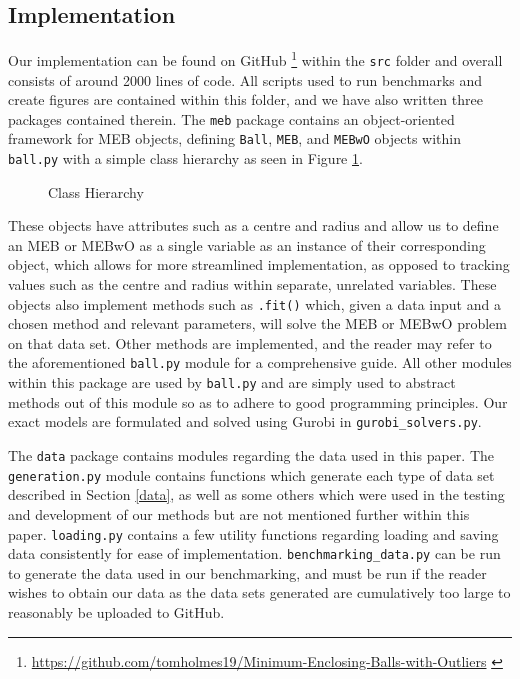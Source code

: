 \documentclass[11pt,twoside]{report}
\theoremstyle{definition}
\numberwithin{theorem}{section}
\numberwithin{definition}{section}
\numberwithin{lemma}{section}
\numberwithin{proposition}{section}
\numberwithin{equation}{section}
\numberwithin{figure}{section}
\begin{document}
\subsection{Implementation}
Our implementation can be found on GitHub \footnote{\url{https://github.com/tomholmes19/Minimum-Enclosing-Balls-with-Outliers} \cite{Holmes_Minimum_Enclosing_Balls_2021}} within the \texttt{src} folder and overall consists of around 2000 lines of code. All scripts used to run benchmarks and create figures are contained within this folder, and we have also written three packages contained therein. The \texttt{meb} package contains an object-oriented framework for MEB objects, defining \texttt{Ball}, \texttt{MEB}, and \texttt{MEBwO} objects within \texttt{ball.py} with a simple class hierarchy as seen in Figure \ref{fig:hierarchy}. 

\begin{figure}
    \centering
    \caption{Class Hierarchy}
    \label{fig:hierarchy}
\end{figure}

These objects have attributes such as a centre and radius and allow us to define an MEB or MEBwO as a single variable as an instance of their corresponding object, which allows for more streamlined implementation, as opposed to tracking values such as the centre and radius within separate, unrelated variables. These objects also implement methods such as \texttt{.fit()} which, given a data input and a chosen method and relevant parameters, will solve the MEB or MEBwO problem on that data set. Other methods are implemented, and the reader may refer to the aforementioned \texttt{ball.py} module for a comprehensive guide. All other modules within this package are used by \texttt{ball.py} and are simply used to abstract methods out of this module so as to adhere to good programming principles. Our exact models are formulated and solved using Gurobi in \texttt{gurobi\_solvers.py}.

The \texttt{data} package contains modules regarding the data used in this paper. The \texttt{generation.py} module contains functions which generate each type of data set described in Section \ref{data}, as well as some others which were used in the testing and development of our methods but are not mentioned further within this paper. \texttt{loading.py} contains a few utility functions regarding loading and saving data consistently for ease of implementation. \texttt{benchmarking\_data.py} can be run to generate the data used in our benchmarking, and must be run if the reader wishes to obtain our data as the data sets generated are cumulatively too large to reasonably be uploaded to GitHub.
\end{document}
